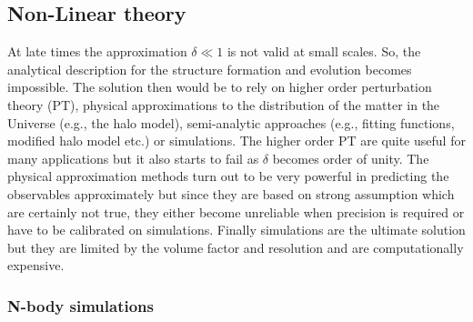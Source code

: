 \subsection{Non-Linear theory}

At late times the approximation $\delta \ll 1$ is not valid at small scales. So, the analytical
description for the structure formation and evolution becomes impossible. The solution then would 
be to rely on higher order perturbation theory (PT), physical approximations to the
distribution of the matter in the Universe (e.g., the halo model), 
semi-analytic approaches (e.g., fitting functions, modified halo model etc.) or simulations. 
The higher order PT are quite useful for many applications but it also starts to 
fail as $\delta$ becomes order of unity. The physical approximation methods turn 
out to be very powerful in predicting the observables approximately 
but since they are based on strong assumption which are 
certainly not true, they either become unreliable when precision is required or have
to be calibrated on simulations. Finally simulations are the ultimate solution but they
are limited by the volume factor and resolution and are computationally expensive. 


\subsubsection{N-body simulations}

